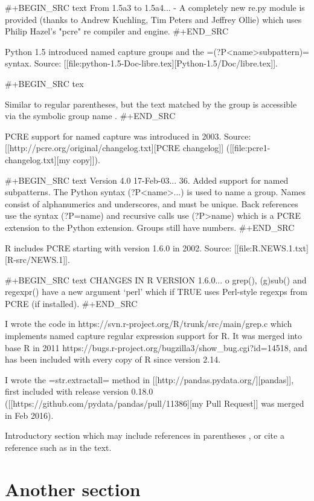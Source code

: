 #+BEGIN_SRC text
From 1.5a3 to 1.5a4...
- A completely new re.py module is provided (thanks to Andrew
Kuchling, Tim Peters and Jeffrey Ollie) which uses Philip Hazel's
"pcre" re compiler and engine.
#+END_SRC

Python 1.5 introduced named capture groups and the =(?P<name>subpattern)=
syntax. Source: [[file:python-1.5-Doc-libre.tex][Python-1.5/Doc/libre.tex]].

#+BEGIN_SRC tex
\item[\code{(?P<\var{name}>...)}] Similar to regular parentheses, but
the text matched by the group is accessible via the symbolic group
name .
#+END_SRC

PCRE support for named capture was introduced in 2003. Source: [[http://pcre.org/original/changelog.txt][PCRE
changelog]] ([[file:pcre1-changelog.txt][my copy]]).

#+BEGIN_SRC text
Version 4.0 17-Feb-03...
36. Added support for named subpatterns. The Python syntax (?P<name>...) is
used to name a group. Names consist of alphanumerics and underscores, and must
be unique. Back references use the syntax (?P=name) and recursive calls use
(?P>name) which is a PCRE extension to the Python extension. Groups still have
numbers.
#+END_SRC

R includes PCRE starting with version 1.6.0 in 2002. Source:
[[file:R.NEWS.1.txt][R-src/NEWS.1]].

#+BEGIN_SRC text
CHANGES IN R VERSION 1.6.0...
    o	grep(), (g)sub() and regexpr() have a new argument `perl'
	which if TRUE uses Perl-style regexps from PCRE (if installed).
#+END_SRC

I wrote the code in https://svn.r-project.org/R/trunk/src/main/grep.c
which implements named capture regular expression support for R. It
was merged into base R in 2011
https://bugs.r-project.org/bugzilla3/show_bug.cgi?id=14518, and has
been included with every copy of R since version 2.14.

I wrote the =str.extractall= method in [[http://pandas.pydata.org/][pandas]], first included with
release version 0.18.0 ([[https://github.com/pydata/pandas/pull/11386][my Pull Request]] was merged in Feb 2016).


Introductory section which may include references in parentheses
\citep{R}, or cite a reference such as \citet{R} in the text.

\section{Another section}


